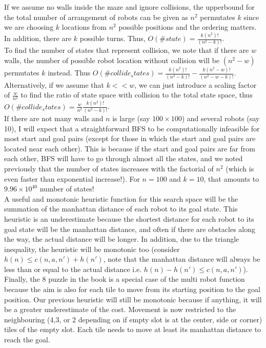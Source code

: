 \documentclass[9.5pt]{extarticle}
\begin{document}
If we assume no walls inside the maze and ignore collisions, the upperbound for the total number of arrangement of robots can be given as $n^2$ permutates $k$ since we are choosing $k$ locations from $n^2$ possible positions and the ordering matters. In addition, there are $k$ possible turns. Thus, $O(\#state) = \frac{k(n^2)!}{(n^2-k)!}$.\\

To find the number of states that represent collision, we note that if there are $w$ walls, the number of  possible robot location without collision will be $(n^2 - w)$ permutates $k$ instead. Thus $O(\#collide_states) =  \frac{k(n^2)!}{(n^2-k)!} - \frac{k(n^2-w)!}{(n^2-w-k)!}$. Alternatively, if we assume that $k << w$, we can just introduce a scaling factor of $\frac{w}{n^2}$ to find the ratio of state space with collision to the total state space, thus $O(\#collide_states) = \frac{w}{n^2}\frac{k(n^2)!}{(n^2-k)!}$.\\

If there are not many walls and $n$ is large (say $100 \times 100$) and several robots (say 10), I will expect that a straightforward BFS to be computationally infeasible for most start and goal pairs (except for those in which the start and goal pairs are located near each other). This is because if the start and goal pairs are far from each other, BFS will have to go through almost all the states, and we noted previously that the number of states increases with the factorial of $n^2$ (which is even faster than exponential increase!). For $n=100$ and $k=10$, that amounts to $9.96 \times 10^{40}$ number of states!\\

A useful and monotonic heuristic function for this search space will be the summation of the manhattan distance of each robot to its goal state. This heuristic is an underestimate because the shortest distance for each robot to its goal state will be the manhattan distance, and often if there are obstacles along the way, the actual distance will be longer. In addition, due to the triangle inequality, the heuristic will be monotonic too (consider $h(n) \leq c(n,a,n') + h(n')$, note that the manhattan distance will always be less than or equal to the actual distance i.e. $h(n) - h(n') \le c(n,a,n')$).\\

Finally, the 8 puzzle in the book is a special case of the multi robot function because the aim is also for each tile to move from its starting position to the goal position. Our previous heuristic will still be monotonic because if anything, it will be a greater underestimate of the cost. Movement is now restricted to the neighbouring (4,3, or 2 depending on if empty slot is at the center, side or corner) tiles of the empty slot. Each tile needs to move at least its manhattan distance to reach the goal.\\
\end{document}
